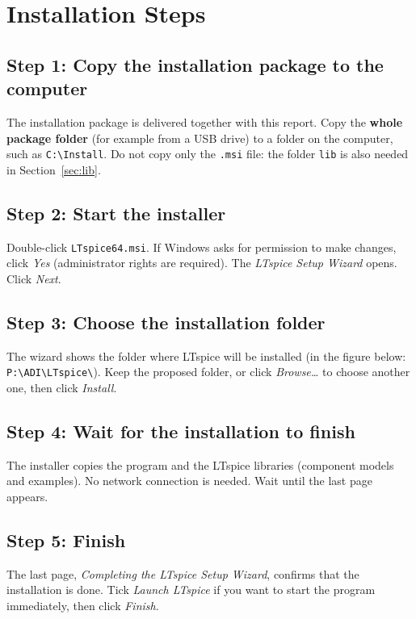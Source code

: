 \section{Installation Steps}

\subsection{Step 1: Copy the installation package to the computer}
The installation package is delivered together with this report. Copy the \textbf{whole package folder}
(for example from a USB drive) to a folder on the computer, such as \texttt{C:\textbackslash Install}.
Do not copy only the \texttt{.msi} file: the folder \texttt{lib} is also needed in Section~\ref{sec:lib}.

\subsection{Step 2: Start the installer}
Double-click \texttt{LTspice64.msi}. If Windows asks for permission to make changes, click \textit{Yes}
(administrator rights are required). The \textit{LTspice Setup Wizard} opens. Click \textit{Next}.

\subsection{Step 3: Choose the installation folder}
The wizard shows the folder where LTspice will be installed (in the figure below:
\texttt{P:\textbackslash ADI\textbackslash LTspice\textbackslash}). Keep the proposed folder, or click
\textit{Browse\ldots} to choose another one, then click \textit{Install}.

\subsection{Step 4: Wait for the installation to finish}
The installer copies the program and the LTspice libraries (component models and examples).
No network connection is needed. Wait until the last page appears.

\subsection{Step 5: Finish}
The last page, \textit{Completing the LTspice Setup Wizard}, confirms that the installation is done.
Tick \textit{Launch LTspice} if you want to start the program immediately, then click \textit{Finish}.

